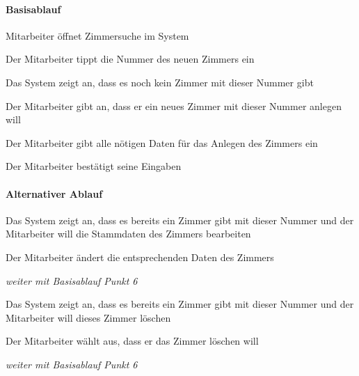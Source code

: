 \paragraph{Basisablauf}
\begin{enumerate}
\item Mitarbeiter öffnet Zimmersuche im System
\item Der Mitarbeiter tippt die Nummer des neuen Zimmers ein
\item Das System zeigt an, dass es noch kein Zimmer mit dieser Nummer gibt
\item Der Mitarbeiter gibt an, dass er ein neues Zimmer mit dieser Nummer anlegen will
\item Der Mitarbeiter gibt alle nötigen Daten für das Anlegen des Zimmers ein
\item Der Mitarbeiter bestätigt seine Eingaben

\paragraph{Alternativer Ablauf}
\begin{longenum}
	\item
	\begin{longenum}
		\item Das System zeigt an, dass es bereits ein Zimmer gibt mit dieser Nummer und der Mitarbeiter will die Stammdaten des Zimmers bearbeiten
		\begin{longenum}
			\item Der Mitarbeiter ändert die entsprechenden Daten des Zimmers 
			\item \emph{weiter mit Basisablauf Punkt 6}
		\end{longenum}
	\end{longenum}
	
	\item
	\item
	\item
	\begin{longenum}
		\item Das System zeigt an, dass es bereits ein \Gls{Zimmer} gibt mit dieser Nummer und der Mitarbeiter will dieses Zimmer löschen
		\begin{longenum}
			\item Der Mitarbeiter wählt aus, dass er das Zimmer löschen will
			\item \emph{weiter mit Basisablauf Punkt 6}
		\end{longenum}
		
		
\end{longenum}


\end{longenum}
\end{enumerate}
